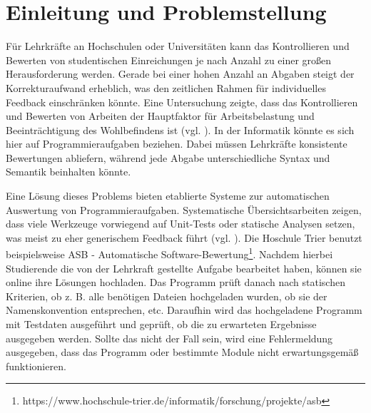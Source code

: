 \chapter{Einleitung und Problemstellung}




Für Lehrkräfte an Hochschulen oder Universitäten kann das Kontrollieren und Bewerten von studentischen Einreichungen je nach Anzahl zu einer großen Herausforderung werden. Gerade bei einer hohen Anzahl an Abgaben steigt der Korrekturaufwand erheblich, was den zeitlichen Rahmen für individuelles Feedback einschränken könnte. Eine Untersuchung zeigte, dass das Kontrollieren und Bewerten von Arbeiten der Hauptfaktor für Arbeitsbelastung und Beeinträchtigung des Wohlbefindens ist (vgl. \cite{Jerrim.2021}). In der Informatik könnte es sich hier auf Programmieraufgaben beziehen. Dabei müssen Lehrkräfte konsistente Bewertungen abliefern, während jede Abgabe unterschiedliche Syntax und Semantik beinhalten könnte.

Eine Lösung dieses Problems bieten etablierte Systeme zur automatischen Auswertung von Programmieraufgaben. Systematische Übersichtsarbeiten zeigen, dass viele Werkzeuge vorwiegend auf Unit-Tests oder statische Analysen setzen, was meist zu eher generischem Feedback führt (vgl. \cite{Messer.2023}). Die Hoschule Trier benutzt beispielsweise ASB - Automatische Software-Bewertung\footnote{https://www.hochschule-trier.de/informatik/forschung/projekte/asb}. Nachdem hierbei Studierende die von der Lehrkraft gestellte Aufgabe bearbeitet haben, können sie online ihre Lösungen hochladen. Das Programm prüft danach nach statischen Kriterien, ob z. B. alle benötigen Dateien hochgeladen wurden, ob sie der Namenskonvention entsprechen, etc. Daraufhin wird das hochgeladene Programm mit Testdaten ausgeführt und geprüft, ob die zu erwarteten Ergebnisse ausgegeben werden. Sollte das nicht der Fall sein, wird eine Fehlermeldung ausgegeben, dass das Programm oder bestimmte Module nicht erwartungsgemäß funktionieren. 

